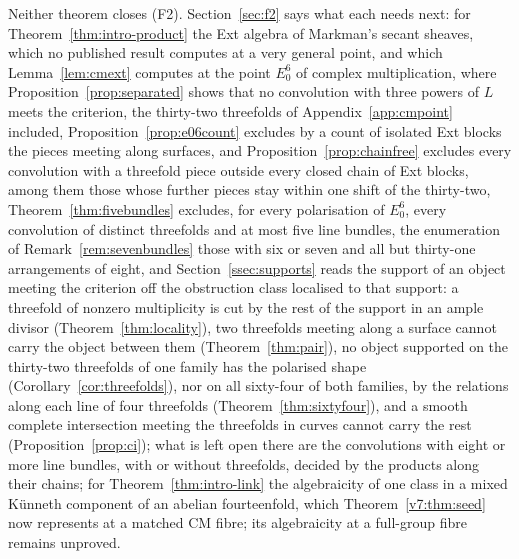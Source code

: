\documentclass[11pt,reqno]{amsart}
\numberwithin{equation}{section}
\theoremstyle{plain}
\theoremstyle{definition}
\newcommand{\Fii}{\texorpdfstring{\textup{(F2)}}{(F2)}}
\begin{document}
Neither theorem closes \Fii{}. Section~\ref{sec:f2} says what each needs next: for Theorem~\ref{thm:intro-product} the Ext algebra of Markman's secant sheaves, which no published result computes at a very general point, and which Lemma~\ref{lem:cmext} computes at the point $E_{0}^{6}$ of complex multiplication, where Proposition~\ref{prop:separated} shows that no convolution with three powers of $L$ meets the criterion, the thirty-two threefolds of Appendix~\ref{app:cmpoint} included, Proposition~\ref{prop:e06count} excludes by a count of isolated Ext blocks the pieces meeting along surfaces, and Proposition~\ref{prop:chainfree} excludes every convolution with a threefold piece outside every closed chain of Ext blocks, among them those whose further pieces stay within one shift of the thirty-two, Theorem~\ref{thm:fivebundles} excludes, for every polarisation of $E_{0}^{6}$, every convolution of distinct threefolds and at most five line bundles, the enumeration of Remark~\ref{rem:sevenbundles} those with six or seven and all but thirty-one arrangements of eight, and Section~\ref{ssec:supports} reads the support of an object meeting the criterion off the obstruction class localised to that support: a threefold of nonzero multiplicity is cut by the rest of the support in an ample divisor (Theorem~\ref{thm:locality}), two threefolds meeting along a surface cannot carry the object between them (Theorem~\ref{thm:pair}), no object supported on the thirty-two threefolds of one family has the polarised shape (Corollary~\ref{cor:threefolds}), nor on all sixty-four of both families, by the relations along each line of four threefolds (Theorem~\ref{thm:sixtyfour}), and a smooth complete intersection meeting the threefolds in curves cannot carry the rest (Proposition~\ref{prop:ci}); what is left open there are the convolutions with eight or more line bundles, with or without threefolds, decided by the products along their chains; for Theorem~\ref{thm:intro-link} the algebraicity of one class in a mixed K\"unneth component of an abelian fourteenfold, which Theorem~\ref{v7:thm:seed} now represents at a matched CM fibre; its algebraicity at a full-group fibre remains unproved.
\end{document}
